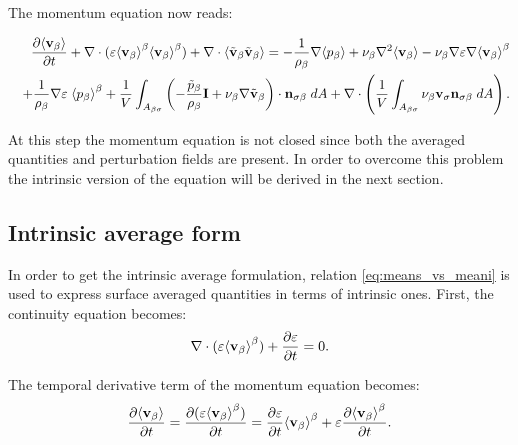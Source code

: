 
\noindent The momentum equation now reads:

\begin{eqnarray}
&&\dfrac{\partial {\left< \textbf{v}_{\beta}\right>}}{\partial t} + \nabla \cdot (\varepsilon {\left< \textbf{v}_{\beta}\right>}^{\beta}{\left< \textbf{v}_{\beta} \right>}^{\beta}) + \nabla \cdot {\left< \tilde{\textbf{v}}_{\beta}\tilde{\textbf{v}}_{\beta}\right>} = -\dfrac{1}{\rho_{\beta}} \nabla {\left< p_{\beta}\right>} + \nu_{\beta}\nabla^2 {\left< \textbf{v}_{\beta} \right>}  - \nu_{\beta} \nabla \varepsilon \nabla {\left< \textbf{v}_{\beta}\right>}^{\beta}  \nonumber \\
&&+\dfrac{1}{\rho_{\beta}}\nabla\varepsilon \; {\left< p_{\beta} \right>}^{\beta} +\dfrac{1}{V} \displaystyle\int_{A_{\beta \sigma}} \left( -\dfrac{\tilde{p}_{\beta}}{\rho_{\beta}} \mathbf{I} + \nu_{\beta} \nabla \tilde{\textbf{v}}_{\beta}  \right)\cdot \mathbf{n}_{\sigma \beta} \;dA + \nabla \cdot \left( \dfrac{1}{V} \int_{A_{\beta \sigma}}  \nu_{\beta} \textbf{v}_{\sigma} \mathbf{n}_{\sigma \beta} \;dA \right).  \nonumber \\
\label{eq:NS_2}
\end{eqnarray}

At this step the momentum equation is not closed since both the averaged quantities and perturbation fields are present.
In order to overcome this problem the intrinsic version of the equation will be derived in the next section.

\subsection{Intrinsic average form}
In order to get the intrinsic average formulation, relation \eqref{eq:means_vs_meani} is used to express surface averaged quantities in terms of intrinsic ones. First, the continuity equation becomes:
$$
\nabla \cdot (\varepsilon{\left< \textbf{v}_{\beta}\right>}^{\beta} ) + \dfrac{\partial \varepsilon}{\partial t}= 0.
$$

\noindent The temporal derivative term of the momentum equation becomes:
$$
\dfrac{\partial {\left< \textbf{v}_{\beta}\right>}}{\partial t} = \dfrac{\partial (\varepsilon{\left< \textbf{v}_{\beta}\right>}^{\beta})}{\partial t} = \dfrac{\partial \varepsilon}{\partial t}{\left< \textbf{v}_{\beta} \right>}^{\beta} + \varepsilon \dfrac{\partial {\left< \textbf{v}_{\beta}\right>}^{\beta}}{\partial t}.
$$

